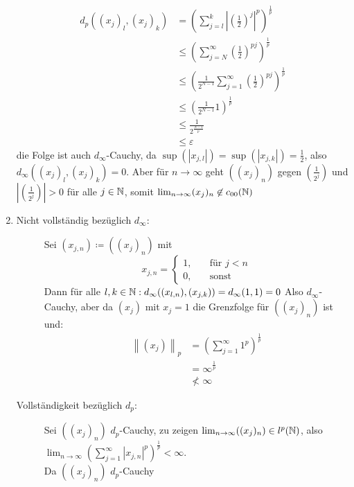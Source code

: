 \documentclass[sectionformat=aufgabe]{gadsescript}
\begin{document}
\begin{enumerate}[label=(\alph*)]
		\begin{align*}
			d_p((x_j)_l, (x_j)_k) &= \left( \sum_{j=l}^{k} \left| \left( \frac{ 1 }{ 2 }  \right) ^j \right| ^p \right) ^{\frac{ 1 }{ p } }  \\
			&\leq \left( \sum_{j=N}^{\infty} \left( \frac{ 1 }{ 2 }  \right) ^{pj}  \right) ^{\frac{ 1 }{ p } }  \\
			&\leq \left( \frac{ 1 }{ 2^{N - 1} } \sum_{j=1}^{\infty} \left( \frac{ 1 }{ 2 }  \right) ^{pj}  \right) ^{\frac{ 1 }{ p } }  \\
			&\leq \left( \frac{ 1 }{ 2^{N - 1} } 1  \right) ^{\frac{ 1 }{ p } }  \\
			&\leq \frac{ 1 }{ 2^{\frac{N - 1}{ p } } } \\ 
			&\leq \varepsilon 
		\end{align*}
		die Folge ist auch $ d_{\infty}  $-Cauchy, da $ \sup(|x_{j, l}|) = \sup(| x_{j, k}| ) = \frac{ 1 }{ 2 } $, also $ d_\infty((x_j)_l , (x_j)_k ) = 0 $.
		Aber für $ n \to \infty $ geht $ ((x_{j})_n )  $ gegen $ \left( \frac{ 1 }{ 2^j } \right) $ und $ \left| \left( \frac{ 1 }{ 2^j }  \right)  \right| > 0 $ für alle $ j \in \mathbb{N} $, somit $ \lim_{n \to \infty}  (x_j)_n \not\in c_{00}(\mathbb{N} ) $
	\item 
		\begin{description}
			\item[Nicht vollständig bezüglich $ d_\infty $:] Sei $ (x_{j, n}) \coloneqq ((x_j)_n) $ mit
				\[
					x_{j, n}  = \begin{cases}
						1, &\quad \text{für } j < n\\
						0, &\quad \text{sonst} 
					\end{cases}
				\]
				Dann für alle $ l, k \in \mathbb{N} : d_{\infty} ((x_{l, n} ), (x_{j, k})) = d_{\infty} (1, 1) = 0  $
				Also $ d_\infty $-Cauchy, aber da $ (x_j) $ mit $ x_j = 1 $ die Grenzfolge für $ ((x_j)_n) $ ist und:
				\begin{align*}
					\left\| (x_j) \right\| _p &= \left( \sum_{j=1}^{\infty} 1^p \right) ^{\frac{ 1 }{ p } }  \\
					&= \infty^{\frac{ 1 }{ p } }  \\
					&\nless \infty
				\end{align*}
			\item[Vollständigkeit bezüglich $ d_p $:]
				Sei $ ((x_j)_n) $ $ d_p $-Cauchy, zu zeigen $ \lim_{n \to \infty} ((x_j)_n) \in l^p(\mathbb{N} ) $, also $ \lim_{n \to \infty} \left( \sum_{j=1}^{\infty} \left| x_{j, n}  \right| ^p \right) ^{\frac{ 1 }{ p } } < \infty $.\\
				Da $ ((x_j)_n) $ $ d_p $-Cauchy
		\end{description}
		
		
\end{enumerate}
\end{document}
